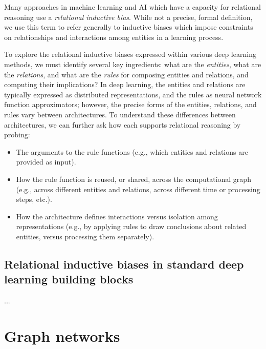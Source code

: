 \documentclass[10pt]{book}
\let\defaultmarginpar\marginpar
\renewcommand\marginpar[2][]{\defaultmarginpar{\itshape\color{gray}#2}}
\begin{document}
Many approaches in machine learning and AI which have a capacity for relational reasoning use a \emph{relational inductive bias}\marginpar{relational inductive bias}. While not a precise, formal definition, we use this term to refer generally to inductive biases  which impose constraints on relationships and interactions among entities in a learning process.

To explore the relational inductive biases expressed within various deep learning methods, we must identify several key ingredients: what are the \emph{entities}, what are the \emph{relations}, and what are the \emph{rules} for composing entities and relations, and computing their implications? In deep learning, the entities and relations are typically expressed as distributed representations, and the rules as neural network function approximators; however, the precise forms of the entities, relations, and rules vary between architectures. To understand these differences between architectures, we can further ask how each supports relational reasoning by probing:
\begin{itemize}
    \item The arguments to the rule functions (e.g., which entities and relations are provided as input).
    \item How the rule function is reused, or shared, across the computational graph (e.g., across different entities and relations, across different time or processing steps, etc.).
    \item How the architecture defines interactions versus isolation among representations (e.g., by applying rules to draw conclusions about related entities, versus processing them separately).
\end{itemize}

\subsection{Relational inductive biases in standard deep learning building blocks}

...

\section{Graph networks}
\end{document}
